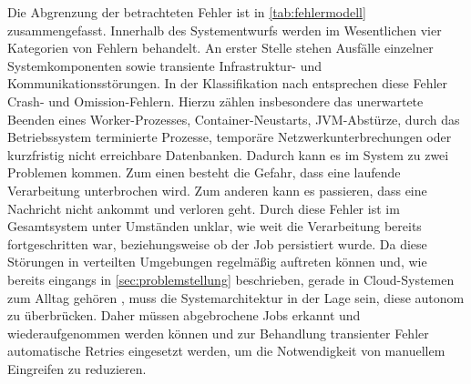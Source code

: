 Die Abgrenzung der betrachteten Fehler ist in \cref{tab:fehlermodell} zusammengefasst.
Innerhalb des Systementwurfs werden im Wesentlichen vier Kategorien von Fehlern behandelt.
An erster Stelle stehen Ausfälle einzelner Systemkomponenten sowie transiente Infrastruktur- und Kommunikationsstörungen.
In der Klassifikation nach \textcite{cristian_understanding_1991} entsprechen diese Fehler Crash- und Omission-Fehlern.
Hierzu zählen insbesondere das unerwartete Beenden eines Worker-Prozesses, Container-Neustarts, JVM-Abstürze, durch das Betriebssystem terminierte Prozesse,
temporäre Netzwerkunterbrechungen oder kurzfristig nicht erreichbare Datenbanken.
Dadurch kann es im System zu zwei Problemen kommen.
Zum einen besteht die Gefahr, dass eine laufende Verarbeitung unterbrochen wird.
Zum anderen kann es passieren, dass eine Nachricht nicht ankommt und verloren geht.
Durch diese Fehler ist im Gesamtsystem unter Umständen unklar, wie weit die Verarbeitung bereits fortgeschritten war,
beziehungsweise ob der Job persistiert wurde.
Da diese Störungen in verteilten Umgebungen regelmäßig auftreten können \parencite[Kap.~1 Abschnitt \glqq Failure Is Inevitable\grqq]{newman_building_2026}
und, wie bereits eingangs in \cref{sec:problemstellung} beschrieben, gerade in Cloud-Systemen zum Alltag gehören \parencite{microsoft_corporation_hrsg_best_2026-1},
muss die Systemarchitektur in der Lage sein, diese autonom zu überbrücken.
Daher müssen abgebrochene Jobs erkannt und wiederaufgenommen werden können und zur Behandlung transienter Fehler automatische Retries
eingesetzt werden, um die Notwendigkeit von manuellem Eingreifen zu reduzieren.

